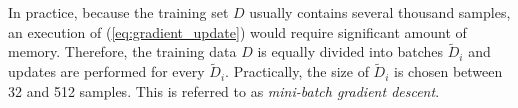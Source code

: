 %

In practice, because the training set $D$ usually contains several thousand samples, an execution of  (\ref{eq:gradient_update}) would require significant amount of memory. Therefore, the training data $D$ is equally divided into batches  $\widetilde{D}_i$  and updates are performed for every $\widetilde{D}_i$. Practically,  the size of $\widetilde{D}_i$ is chosen between 32 and 512 samples. This is referred to as \textit{mini-batch gradient descent}.






